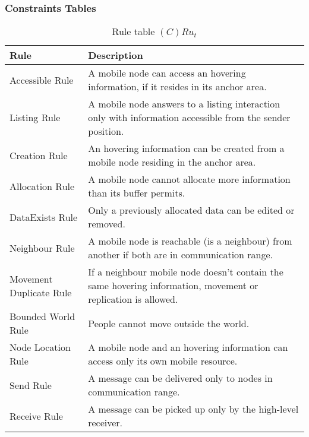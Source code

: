 \subsubsection{Constraints Tables}

\begin{table}[H]
	\centering
	\begin{tabular}{|p{4cm}|p{8cm}|}
			\hline
			\textbf{Rule} & \textbf{Description} \\
			\hline
			Accessible Rule & A mobile node can access an hovering information, if it
			resides in its anchor area. \\
			\hline
			Listing Rule & A mobile node answers to a listing interaction only with
			information accessible from the sender position. \\
			\hline
			Creation Rule & An hovering information can be created from a mobile node
			residing in the anchor area. \\
			\hline
      Allocation Rule & A mobile node cannot allocate more information than its
      buffer permits. \\
			\hline
      DataExists Rule & Only a previously allocated data can be edited or removed. \\
			\hline
			Neighbour Rule & A mobile node is reachable (is a neighbour) from
			another if both are in communication range. \\
			\hline
			Movement Duplicate Rule & If a neighbour mobile node doesn't contain the same
			hovering information, movement or replication is allowed. \\
			\hline
			Bounded World Rule & People cannot move outside the world. \\
			\hline
			Node Location Rule & A mobile node and an hovering information can access
			only its own mobile resource. \\
			\hline
			Send Rule & A message can be delivered only to nodes in communication range. \\
			\hline
			Receive Rule & A message can be picked up only by the high-level receiver. \\
			\hline
		\end{tabular}
	\caption{Rule table $(C)Ru_t$}
	\label{tab:crut}
\end{table}

